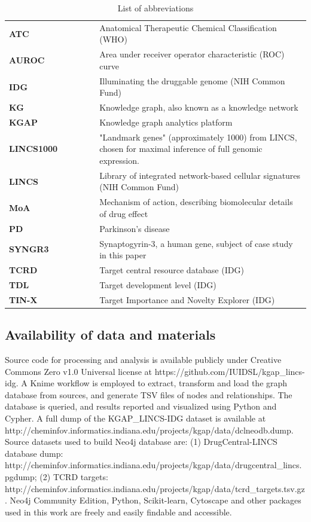 \begin{table}
\caption{List of abbreviations}
\begin{center}
\begin{tabular}{p{0.3\linewidth}p{0.7\linewidth}}
\hline
\textbf{ATC} & Anatomical Therapeutic Chemical Classification (WHO) \\
\textbf{AUROC} & Area under receiver operator characteristic (ROC) curve \\
\textbf{IDG} & Illuminating the druggable genome (NIH Common Fund) \\
\textbf{KG} & Knowledge graph, also known as a knowledge network \\
\textbf{KGAP} & Knowledge graph analytics platform \\
\textbf{LINCS1000} & "Landmark genes" (approximately 1000) from LINCS, chosen for maximal inference of full genomic expression. \\
\textbf{LINCS} & Library of integrated network-based cellular signatures (NIH Common Fund) \\
\textbf{MoA} & Mechanism of action, describing biomolecular details of drug effect \\
\textbf{PD} & Parkinson's disease \\
\textbf{SYNGR3} & Synaptogyrin-3, a human gene, subject of case study in this paper \\
\textbf{TCRD} & Target central resource database (IDG) \\
\textbf{TDL} & Target development level (IDG) \\
\textbf{TIN-X} & Target Importance and Novelty Explorer (IDG) \\
\hline
\end{tabular}
\end{center}
\label{tab:abbr}
\end{table}

\subsection{Availability of data and materials}

Source code for processing and analysis is available publicly under Creative Commons Zero v1.0 Universal license at  https://github.com/IUIDSL/kgap\_lincs-idg. A Knime workflow is employed to extract, transform and load the graph database from sources, and generate TSV files of nodes and relationships. The database is queried, and results reported and visualized using Python and Cypher. A full dump of the KGAP\_LINCS-IDG dataset is available at http://cheminfov.informatics.indiana.edu/projects/kgap/data/dclneodb.dump. Source datasets used to build Neo4j database are: (1) DrugCentral-LINCS database dump: http://cheminfov.informatics.indiana.edu/projects/kgap/data/drugcentral\_lincs.pgdump; (2) TCRD targets: http://cheminfov.informatics.indiana.edu/projects/kgap/data/tcrd\_targets.tsv.gz. Neo4j Community Edition, Python, Scikit-learn, Cytoscape and other packages used in this work are freely and easily findable and accessible.
